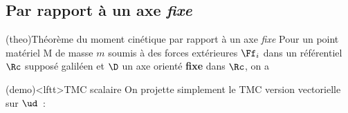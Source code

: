 \documentclass[../../main/main.tex]{subfiles}
\begin{document}
\subsection{Par rapport à un axe  \textit{fixe}}
\begin{tcb*}(theo){Théorème du moment cinétique par rapport à un axe
			 \textit{fixe}}
	Pour un point matériel M de masse $m$ soumis à des forces extérieures
	$\Ff_i$ dans un référentiel $\Rc$ supposé galiléen et $\D$ un axe
	orienté \textbf{fixe} dans $\Rc$, on a
	\psw{
		\[\boxed{\dv{\Lc_{\D}(\Mr)}{t} = \sum_i\Mc_{\D}(\Ff_i)}\]
	}
	\vspace{-15pt}
\end{tcb*}
\begin{tcb*}(demo)<lftt>{TMC scalaire}
	On projette simplement le TMC version vectorielle sur $\ud$~:
\end{tcb*}
\end{document}
